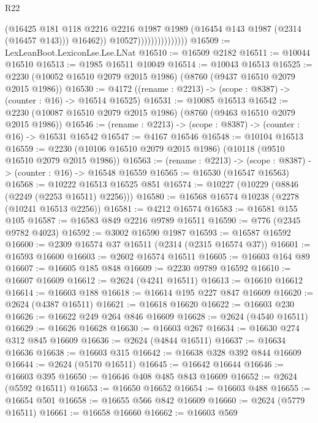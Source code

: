 \begin{lexlean}{R22}
\begin{coremodule}
                                    (@16425
                                      @181
                                      @118
                                      @2216
                                      @2216
                                      @1987
                                      @1989
                                      (@16454 @143 @1987 (@2314 (@16457 @143)))
                                      @16462))
                                  @10527)))))))))))))))
@16509 := LexLeanBoot.LexiconLse.Lse.LNat
@16510 := @16509 @2182
@16511 := @10044 @16510
@16513 := @1985 @16511 @10049
@16514 := @10043 @16513
@16525 := @2230 (@10052 @16510 @2079 @2015 @1986) (@8760 (@9437 @16510 @2079 @2015 @1986))
@16530 := @4172 ((rename : @2213) -> (scope : @8387) -> (counter : @16) -> @16514 @16525)
@16531 := @10085 @16513
@16542 := @2230 (@10087 @16510 @2079 @2015 @1986) (@8760 (@9463 @16510 @2079 @2015 @1986))
@16546 := (rename : @2213) -> (scope : @8387) -> (counter : @16) -> @16531 @16542
@16547 := @4167 @16546
@16548 := @10104 @16513
@16559 := @2230 (@10106 @16510 @2079 @2015 @1986) (@10118 (@9510 @16510 @2079 @2015 @1986))
@16563 := (rename : @2213) -> (scope : @8387) -> (counter : @16) -> @16548 @16559
@16565 := @16530 (@16547 @16563)
@16568 := @10222 @16513 @16525 @851
@16574 := @10227 (@10229 (@8846 (@2249 (@2253 @16511) @2256)))
@16580 := @16568 @16574 @10238 (@2278 (@10241 @16513 @2256))
@16581 := @4212 @16574
@16583 := @16581 @155 @105
@16587 := @16583 @849 @2216 @9789 @16511
@16590 := @776 (@2345 @9782 @4023)
@16592 := @3002 @16590 @1987
@16593 := @16587 @16592
@16600 := @2309 @16574 @37 @16511 (@2314 (@2315 @16574 @37))
@16601 := @16593 @16600
@16603 := @2602 @16574 @16511
@16605 := @16603 @164 @89
@16607 := @16605 @185 @848
@16609 := @2230 @9789 @16592
@16610 := @16607 @16609
@16612 := @2624 (@4241 @16511)
@16613 := @16610 @16612
@16614 := @16603 @188
@16618 := @16614 @195 @227 @847 @16609
@16620 := @2624 (@4387 @16511)
@16621 := @16618 @16620
@16622 := @16603 @230
@16626 := @16622 @249 @264 @846 @16609
@16628 := @2624 (@4540 @16511)
@16629 := @16626 @16628
@16630 := @16603 @267
@16634 := @16630 @274 @312 @845 @16609
@16636 := @2624 (@4844 @16511)
@16637 := @16634 @16636
@16638 := @16603 @315
@16642 := @16638 @328 @392 @844 @16609
@16644 := @2624 (@5170 @16511)
@16645 := @16642 @16644
@16646 := @16603 @395
@16650 := @16646 @408 @485 @843 @16609
@16652 := @2624 (@5592 @16511)
@16653 := @16650 @16652
@16654 := @16603 @488
@16655 := @16654 @501
@16658 := @16655 @566 @842 @16609
@16660 := @2624 (@5779 @16511)
@16661 := @16658 @16660
@16662 := @16603 @569

\end{coremodule}
\end{lexlean}
